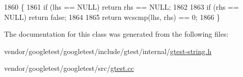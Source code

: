 \begin{DoxyCode}
1860                                                                        \{
1861   \textcolor{keywordflow}{if} (lhs == NULL) \textcolor{keywordflow}{return} rhs == NULL;
1862 
1863   \textcolor{keywordflow}{if} (rhs == NULL) \textcolor{keywordflow}{return} \textcolor{keyword}{false};
1864 
1865   \textcolor{keywordflow}{return} wcscmp(lhs, rhs) == 0;
1866 \}
\end{DoxyCode}


The documentation for this class was generated from the following files\+:\begin{DoxyCompactItemize}
\item 
vendor/googletest/googletest/include/gtest/internal/\hyperlink{gtest-string_8h}{gtest-\/string.\+h}\item 
vendor/googletest/googletest/src/\hyperlink{gtest_8cc}{gtest.\+cc}\end{DoxyCompactItemize}
